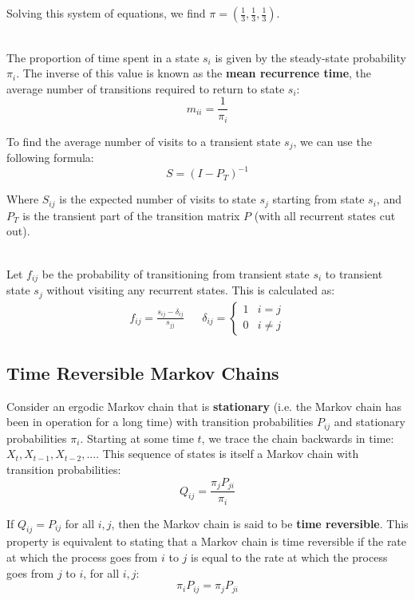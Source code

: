 \documentclass[12pt]{article}
\begin{document}
\noindent
Solving this system of equations, we find $\pi = \left( \frac{1}{3}, \frac{1}{3}, \frac{1}{3} \right)$.

\noindent
\\
The proportion of time spent in a state $s_i$ is given by the steady-state probability $\pi_i$.
The inverse of this value is known as the \textbf{mean recurrence time}, the average number of transitions required to return to state $s_i$:
\[ m_{ii} = \frac{1}{\pi_i} \]

\noindent
To find the average number of visits to a transient state $s_j$, we can use the following formula:
\[ S = (I - P_T)^{-1} \]

\noindent
Where $S_{ij}$ is the expected number of visits to state $s_j$ starting from state $s_i$, and $P_T$ is the transient part of the transition matrix $P$ (with all recurrent states cut out).

\noindent
\\
Let $f_{ij}$ be the probability of transitioning from transient state $s_i$ to transient state $s_j$ without visiting any recurrent states.
This is calculated as:
\begin{align*}
    f_{ij} = \frac{s_{ij} - \delta_{ij}}{s_{jj}} && \delta_{ij} = \begin{cases}
        1 & i = j \\
        0 & i \neq j
    \end{cases}
\end{align*}

\subsection{Time Reversible Markov Chains}
Consider an ergodic Markov chain that is \textbf{stationary} (i.e. the Markov chain has been in operation for a long time) with transition probabilities $P_{ij}$ and stationary probabilities $\pi_i$.
Starting at some time $t$, we trace the chain backwards in time: $X_t, X_{t - 1}, X_{t - 2}, ...$.
This sequence of states is itself a Markov chain with transition probabilities:
\[ Q_{ij} = \frac{\pi_j P_{ji}}{\pi_i} \]

\noindent
If $Q_{ij} = P_{ij}$ for all $i, j$, then the Markov chain is said to be \textbf{time reversible}.
This property is equivalent to stating that a Markov chain is time reversible if the rate at which the process goes from $i$ to $j$ is equal to the rate at which the process goes from $j$ to $i$, for all $i, j$:
\[ \pi_i P_{ij} = \pi_j P_{ji} \]
\end{document}
